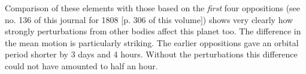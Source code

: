\par\indent Comparison of these elements with those based on the \emph{first} four oppositions (see no. 136 of this journal for 1808 [p. 306 of this volume]) shows very clearly how strongly perturbations from other bodies affect this planet too. The difference in the mean motion is particularly striking. The earlier oppositions gave an orbital period shorter by 3 days and 4 hours. Without the perturbations this difference could not have amounted to half an hour.
